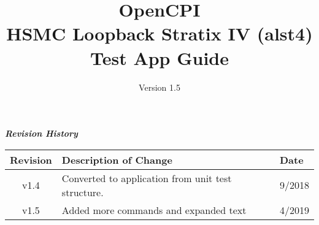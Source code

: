 \iffalse
This file is protected by Copyright. Please refer to the COPYRIGHT file
distributed with this source distribution.

This file is part of OpenCPI <http://www.opencpi.org>

OpenCPI is free software: you can redistribute it and/or modify it under the
terms of the GNU Lesser General Public License as published by the Free Software
Foundation, either version 3 of the License, or (at your option) any later
version.

OpenCPI is distributed in the hope that it will be useful, but WITHOUT ANY
WARRANTY; without even the implied warranty of MERCHANTABILITY or FITNESS FOR A
PARTICULAR PURPOSE. See the GNU Lesser General Public License for more details.

You should have received a copy of the GNU Lesser General Public License along
with this program. If not, see <http://www.gnu.org/licenses/>.
\fi

\def\docTitle{OpenCPI\\ HSMC Loopback Stratix IV (alst4) Test App Guide}
\def\docVersion{1.5}

\date{Version \docVersion} %
\title{\docTitle}
\usepackage{graphicx}
\graphicspath{ {figures/} }
\usepackage{textcomp}
\usepackage{listings}



\maketitle
	\begin{center}
	\textit{\textbf{Revision History}}
		\begin{table}[H]
		\label{table:revisions} %
			\begin{tabularx}{\textwidth}{|c|X|l|}
			\hline
			\rowcolor{blue}
			\textbf{Revision} & \textbf{Description of Change} & \textbf{Date} \\
		    \hline
		    v1.4 & Converted to application from unit test structure. & 9/2018 \\
			\hline
			v1.5 & Added more commands and expanded text & 4/2019 \\
			\hline
			\end{tabularx}
		\end{table}
	\end{center}

